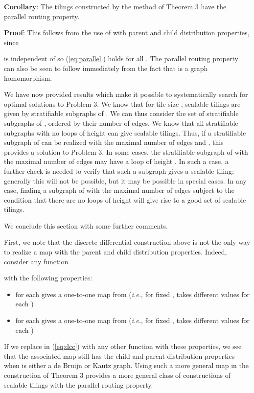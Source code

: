 \documentclass[12pt]{article}
\begin{document}
\noindent
{\bf Corollary}: The tilings constructed by the method of Theorem 3
have the parallel routing property.
\vspace*{0.1in}

\noindent
{\bf Proof}: This follows from the use of  with parent and child
distribution properties, since

is independent of  so (\ref{eq:parallel}) holds for all .
The parallel routing property can also be seen to follow immediately
from the fact that  is a graph homomorphism.
\vspace*{0.2in}

We have now provided results which make it possible to systematically
search for optimal solutions to Problem 3.  We know that for tile size
, scalable tilings are given by stratifiable subgraphs of
.  We can thus consider the set of stratifiable subgraphs of
, ordered by their number of edges.  We know that all
stratifiable subgraphs with no loops of height  can give
scalable tilings.  Thus, if a stratifiable subgraph of  can be
realized with the maximal number of edges and , this
provides a solution to Problem 3.  In some cases, the stratifiable
subgraph of  with the maximal number of edges may have a loop
of height .  In such a case, a further check is needed to
verify that such a subgraph gives a scalable tiling; generally this
will not be possible, but it may be possible in special cases.  In any
case, finding a subgraph of  with the maximal number of edges
subject to the condition that there are no loops of height 
will give rise to a good set of scalable tilings.

We conclude this section with some further comments.

First, we note that the discrete differential construction above is
not the only way to realize a map  
with the parent and child distribution properties.  Indeed,
consider any function 

with the following properties:
\begin{itemize}
\item  for each   gives a one-to-one
  map from  ({\it i.e.}, for fixed
  ,  takes different values for each )
\item  for each   gives a one-to-one
  map from  ({\it i.e.}, for fixed
  ,  takes different values for each )
\end{itemize}

If we replace  in (\ref{eq:dcc})
with any other function  with these
properties, we see that the associated map  still has the child and parent distribution properties when
 is either a de Bruijn or Kautz graph.  Using such a more general
map in the construction of Theorem 3 provides a more general class of
constructions of scalable tilings with the parallel routing property.
\end{document}
